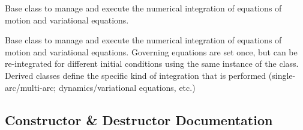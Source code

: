 Base class to manage and execute the numerical integration of equations of motion and variational equations. 

Base class to manage and execute the numerical integration of equations of motion and variational equations. Governing equations are set once, but can be re-\/integrated for different initial conditions using the same instance of the class. Derived classes define the specific kind of integration that is performed (single-\/arc/multi-\/arc; dynamics/variational equations, etc.) 

\subsection{Constructor \& Destructor Documentation}
